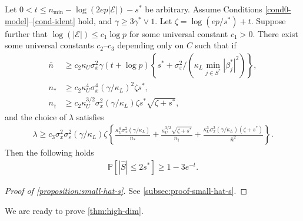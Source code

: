 \documentclass[10pt]{article}
\numberwithin{equation}{section}
\begin{document}
\begin{proposition}
\label{proposition:small-hat-s}
    Let $0<t\le n_{\min} - \log(2ep|\mathcal{E}|) - s^*$ be arbitrary. Assume Conditions \ref{cond0-model}--\ref{cond-ident} hold, and $\gamma \ge 3\gamma^*\lor 1$. Let $\zeta = \log(ep/s^*) + t$. Suppose further that $\log(|\mathcal{E}|) \le c_1 \log p$ for some universal constant $c_1>0$. There exist some universal constants $c_2$--$c_3$ depending only on $C$ such that if \begin{align*}
        \bar{n} &\ge c_2 \kappa_U\sigma_x^2 \gamma (t + \log p) \left\{ s^* +  \sigma_\varepsilon^2 / (\kappa_L \min_{j\in S^*} |\beta_j^*|^2)\right\}, \\
        n_* &\ge c_2 \kappa_U^4\sigma_x^4 (\gamma/\kappa_L)^2  \zeta s^*, \\
        n_\dagger &\ge c_2 \kappa_U^{3/2} \sigma_x^2 (\gamma/\kappa_L) \zeta s^* \sqrt{\zeta + s^*},
    \end{align*}
    and the choice of $\lambda$ satisfies
    \begin{align*}
        \lambda \ge c_3 \sigma_x^2 \sigma_\varepsilon^2 (\gamma/\kappa_L) \zeta \left\{\frac{\kappa_U^4\sigma_x^2 (\gamma/\kappa_L)}{n_*} + \frac{\kappa_U^{3/2} \sqrt{\zeta + s^*}}{n_\dagger} + \frac{\kappa_{U}^3\sigma_x^2 (\gamma/\kappa_L)(\zeta + s^*)}{\bar{n}^2}\right\}.
    \end{align*} Then the following holds
    \begin{align*}
        \mathbb{P}\left[|\hat{S}| \le 2s^*\right] \ge 1-3e^{-t}.
    \end{align*}
\end{proposition}
\begin{proof}[Proof of \cref{proposition:small-hat-s}] 
    See \cref{subsec:proof-small-hat-s}.
\end{proof}

We are ready to prove \cref{thm:high-dim}.
\end{document}
